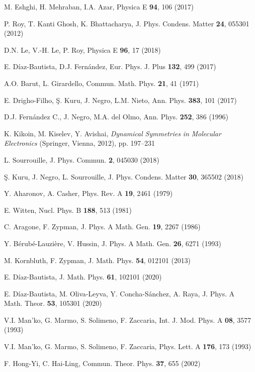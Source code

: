 \documentclass[aps,showpacs,showkeys]{revtex4}
\begin{document}
\begin{thebibliography}{10}
M. Eshghi, H. Mehraban,  I.A. Azar,  Physica E  {\bf 94}, 106 (2017)

P. Roy, T. Kanti Ghosh,  K. Bhattacharya, J. Phys. Condens. Matter {\bf 24}, 055301 (2012)

D.N. Le, V.-H. Le,  P. Roy, Physica E {\bf 96}, 17 (2018)

E. D{\'i}az-Bautista, D.J. Fern{\'a}ndez, Eur. Phys. J. Plus {\bf 132}, 499 (2017)

A.O. Barut, L. Girardello,  Commun. Math. Phys. {\bf 21}, 41 (1971)

E. Drigho-Filho, \c{S}. Kuru, J. Negro,  L.M. Nieto, Ann. Phys. {\bf 383}, 101 (2017)

D.J. Fern\'andez C., J. Negro,  M.A. del Olmo, Ann. Phys. {\bf 252}, 386  (1996)

K. Kikoin, M. Kiselev,  Y. Avishai, {\em Dynamical Symmetries in Molecular Electronics} (Springer, Vienna, 2012), pp. 197–231

L. Sourrouille, J. Phys. Commun. {\bf 2}, 045030 (2018)

\c{S}. Kuru, J. Negro,  L. Sourrouille, J. Phys. Condens. Matter {\bf 30}, 365502 (2018)

Y. Aharonov, A. Casher, Phys. Rev. A {\bf 19}, 2461 (1979)

E. Witten,  Nucl. Phys. B  {\bf 188}, 513 (1981)

C. Aragone, F. Zypman, J. Phys. A Math. Gen. {\bf 19}, 2267 (1986)

Y. B\'erub\'e-Lauzi\`{e}re, V. Hussin, J. Phys. A Math. Gen. {\bf 26}, 6271 (1993)

M. Kornbluth, F. Zypman, J. Math. Phys. {\bf 54}, 012101 (2013)

E. D{\'i}az-Bautista,  J. Math. Phys. {\bf  61}, 102101 (2020)

E. D{\'i}az-Bautista, M. Oliva-Leyva, Y. Concha-S{\'a}nchez, A. Raya, J. Phys. A Math. Theor. {\bf  53}, 105301 (2020)

V.I. Man'ko, G. Marmo, S. Solimeno,  F. Zaccaria, Int. J. Mod. Phys. A  {\bf 08}, 3577 (1993)

V.I. Man'ko, G. Marmo, S. Solimeno,  F. Zaccaria, Phys. Lett. A  {\bf  176}, 173 (1993)

F. Hong-Yi, C. Hai-Ling, Commun. Theor. Phys.  {\bf 37}, 655 (2002)


\end{thebibliography}
\end{document}

